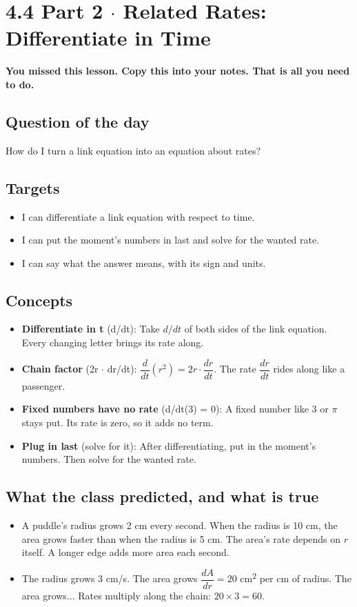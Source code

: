 \documentclass[11pt]{article}
\begin{document}
\section*{4.4 Part 2 $\cdot$ Related Rates: Differentiate in Time}
\textbf{You missed this lesson. Copy this into your notes. That is all you need to do.}\par\medskip
\subsection*{Question of the day}
How do I turn a link equation into an equation about rates?\par
\subsection*{Targets}\begin{itemize}\item I can differentiate a link equation with respect to time.
\item I can put the moment's numbers in last and solve for the wanted rate.
\item I can say what the answer means, with its sign and units.\end{itemize}
\subsection*{Concepts}\begin{itemize}
\item \textbf{Differentiate in t} (d/dt): Take $d/dt$ of both sides of the link equation. Every changing letter brings its rate along.
\item \textbf{Chain factor} (2r $\cdot$ dr/dt): $\dfrac{d}{dt}(r^2)=2r\cdot\dfrac{dr}{dt}$. The rate $\dfrac{dr}{dt}$ rides along like a passenger.
\item \textbf{Fixed numbers have no rate} (d/dt(3) = 0): A fixed number like 3 or $\pi$ stays put. Its rate is zero, so it adds no term.
\item \textbf{Plug in last} (solve for it): After differentiating, put in the moment's numbers. Then solve for the wanted rate.
\end{itemize}
\subsection*{What the class predicted, and what is true}\begin{itemize}
\item A puddle's radius grows 2 cm every second. When the radius is 10 cm, the area grows faster than when the radius is 5 cm.  The area's rate depends on $r$ itself. A longer edge adds more area each second.
\item The radius grows 3 cm/s. The area grows $\dfrac{dA}{dr}=20$ cm\textsuperscript{2} per cm of radius. The area grows...  Rates multiply along the chain: $20\times3=60$.
\end{itemize}
\end{document}
